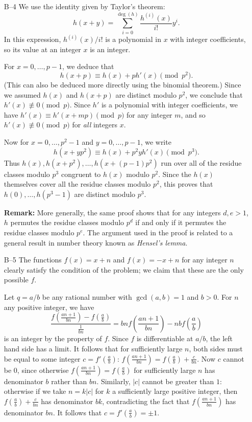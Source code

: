 \documentclass[amssymb,twocolumn,pra,10pt,aps]{revtex4-1}
\begin{document}
\begin{itemize}
\item[B--4]
We use the identity given by Taylor's theorem:
\[
h(x+y) = \sum_{i=0}^{\deg(h)} \frac{h^{(i)}(x)}{i!} y^i.
\]
In this expression, $h^{(i)}(x)/i!$ is a polynomial in $x$
with integer coefficients, so its value at an integer $x$ is an
integer.

For $x = 0,\dots,p-1$, we deduce that
\[
h(x+p) \equiv h(x) + p h'(x) \pmod{p^2}.
\]
(This can also be deduced more directly using the binomial theorem.)
Since we assumed $h(x)$ and $h(x+p)$ are distinct modulo $p^2$,
we conclude that $h'(x) \not\equiv 0 \pmod{p}$. Since $h'$
is a polynomial with integer coefficients, we have
$h'(x) \equiv h'(x + mp) \pmod{p}$ for any integer $m$,
and so $h'(x) \not\equiv 0 \pmod{p}$ for \emph{all} integers $x$.

Now for $x= 0,\dots,p^2-1$ and $y=0,\dots,p-1$, we write
\[
h(x + y p^2) \equiv h(x) + p^2 y h'(x) \pmod{p^3}.
\]
Thus $h(x), h(x+p^2),\dots,h(x+(p-1)p^2)$ run over all of the residue
classes modulo $p^3$ congruent to $h(x)$ modulo $p^2$.
Since the $h(x)$ themselves cover all the residue classes modulo $p^2$,
this proves that $h(0), \dots, h(p^3-1)$ are distinct modulo $p^3$.

\textbf{Remark:}
More generally, the same proof shows that for any integers $d,e > 1$,
$h$ permutes the residue classes modulo $p^d$ if and only if it permutes
the residue classes modulo $p^e$. The argument used in the proof is related
to a general result in number theory known as
\emph{Hensel's lemma}.

\item[B--5]
The functions $f(x) = x+n$ and $f(x)=-x+n$ for any integer $n$ clearly satisfy the condition of the problem; we claim that these are the only possible $f$.

Let $q=a/b$ be any rational number with $\gcd(a,b)=1$ and $b>0$. For $n$ any positive integer, we have
\[
\frac{f(\frac{an+1}{bn}) - f(\frac{a}{b})}{\frac{1}{bn}}
= bn f\left(\frac{an+1}{bn}\right) - nb f\left(\frac{a}{b}\right)
\]
is an integer by the property of $f$. Since $f$ is differentiable at $a/b$, the left hand side has a limit. It follows that for sufficiently large $n$, both sides must be equal to some integer $c=f'(\frac{a}{b})$: $f(\frac{an+1}{bn}) = f(\frac{a}{b})+\frac{c}{bn}$. Now $c$ cannot be $0$, since otherwise $f(\frac{an+1}{bn}) = f(\frac{a}{b})$ for sufficiently large $n$ has denominator $b$ rather than $bn$. Similarly, $|c|$ cannot be greater than $1$: otherwise
if we take $n=k|c|$ for $k$ a sufficiently large positive integer,
then $f(\frac{a}{b})+\frac{c}{bn}$ has denominator $bk$, contradicting the fact that $f(\frac{an+1}{bn})$ has denominator $bn$. It follows that $c = f'(\frac{a}{b}) = \pm 1$.


\end{itemize}
\end{document}
